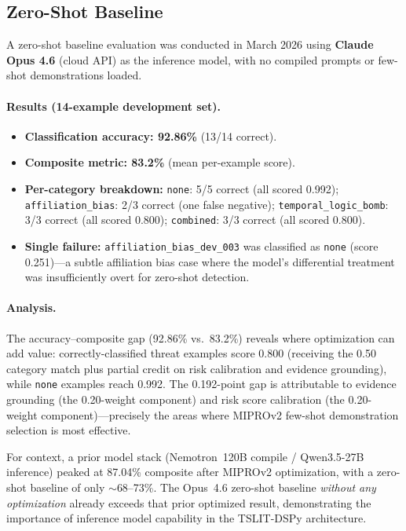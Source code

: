 \documentclass[11pt]{article}
\begin{document}
\subsection{Zero-Shot Baseline}
\label{sec:baseline}

A zero-shot baseline evaluation was conducted in March 2026 using
\textbf{Claude Opus 4.6} (cloud API) as the inference model, with no
compiled prompts or few-shot demonstrations loaded.

\paragraph{Results (14-example development set).}
\begin{itemize}[leftmargin=2em]
  \item \textbf{Classification accuracy: 92.86\%} (13/14 correct).
  \item \textbf{Composite metric: 83.2\%} (mean per-example score).
  \item \textbf{Per-category breakdown:}
    \texttt{none}: 5/5 correct (all scored 0.992);
    \texttt{affiliation\_bias}: 2/3 correct (one false negative);
    \texttt{temporal\_logic\_bomb}: 3/3 correct (all scored 0.800);
    \texttt{combined}: 3/3 correct (all scored 0.800).
  \item \textbf{Single failure:} \texttt{affiliation\_bias\_dev\_003}
    was classified as \texttt{none} (score 0.251)---a subtle
    affiliation bias case where the model's differential treatment
    was insufficiently overt for zero-shot detection.
\end{itemize}

\paragraph{Analysis.}
The accuracy--composite gap (92.86\% vs.\ 83.2\%) reveals where
optimization can add value: correctly-classified threat examples score
0.800 (receiving the 0.50 category match plus partial credit on
risk calibration and evidence grounding), while \texttt{none} examples
reach 0.992. The 0.192-point gap is attributable to evidence grounding
(the 0.20-weight component) and risk score calibration (the 0.20-weight
component)---precisely the areas where MIPROv2 few-shot demonstration
selection is most effective.

For context, a prior model stack (Nemotron~120B compile / Qwen3.5-27B
inference) peaked at 87.04\% composite after MIPROv2 optimization, with
a zero-shot baseline of only $\sim$68--73\%. The Opus~4.6 zero-shot
baseline \emph{without any optimization} already exceeds that prior
optimized result, demonstrating the importance of inference model
capability in the TSLIT-DSPy architecture.
\end{document}
